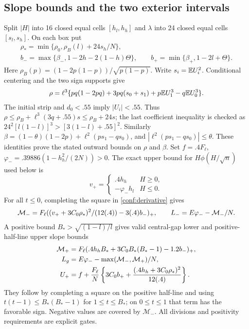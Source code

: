\subsection{Slope bounds and the two exterior intervals}
Split $|H|$ into 16 closed equal cells $[h_l,h_h]$ and $\lambda$ into
24 closed equal cells $[s_l,s_h]$. On each box put
\[
 \begin{gathered}
 \rho_* =\min\{\rho_0,\rho_B(l)+24s_h/N\},\\
 b_- =\max\{\beta_-,1-2h-2(1-h)\Theta\},\qquad
 b_+ =\min\{\beta_+,1-2l+\Theta\}.
 \end{gathered}
\]
Here $\rho_B(p)=(1-2p(1-p))/\sqrt{p(1-p)}$. Write $s_i=\mathbb E U_i^2$. Conditional centering and the two sign supports give
\[
 \rho=\ell^3\{pq(1-2pq)+3pq(s_0+s_1)
                  +p\mathbb E U_1^3-q\mathbb E U_0^3\}.
\]
The initial strip and $d_0<.55$ imply $|U_i|<.55$.
Thus $\rho\le\rho_B+\ell^3(3q+.55)s\le\rho_B+24s$; the last
coefficient inequality is checked as
$24^2[l(1-l)]^3>[3(1-l)+.55]^2$.
Similarly $\beta=(1-\theta)(1-2p)+\ell^2(ps_1-qs_0)$, and
$|\ell^2(ps_1-qs_0)|\le\theta$. These identities prove the stated
outward bounds on $\rho$ and $\beta$.
Set $f=.4F_\ell$, $\varphi_-=.39886(1-h_h^2/(2N))>0$.
The exact upper bound for $H\phi(H/\sqrt n)$ used below is
\[
 v_+=\begin{cases}.4h_h&H\ge0,\\-\varphi_-h_l&H\le0.\end{cases}
\]
For all $t\le0$, completing the square in \eqref{conf:derivative} gives
\[
 \mathcal M_-=F_\ell((v_++3C_0\rho_*)^2/(12(.4))-3(.4)b_-)_+,
 \qquad L_-=E\varphi_- -\mathcal M_-/N.
\]
A positive bound $B_*>\sqrt{(1-l)/l}$ gives valid central-gap lower
and positive-half-line upper slope bounds
\begin{align*}
 \mathcal M_+&=F_\ell(.4h_hB_*+3C_0B_*(B_*-1)-1.2b_-)_+,\\
 L_g&=E\varphi_--\max(\mathcal M_-,\mathcal M_+)/N,\\
 U_+&=f+\frac{F_\ell}{N}
 \left\{3C_0b_++\frac{(.4h_h+3C_0\rho_*)^2}{12(.4)}\right\}.
\end{align*}
They follow by completing a square on the positive half-line and using
$t(t-1)\le B_*(B_*-1)$ for $1\le t\le B_*$; on $0\le t\le1$ that
term has the favorable sign. Negative values are covered by $\mathcal M_-$.
All divisions and positivity requirements are explicit gates.

